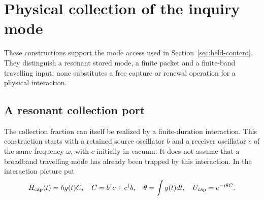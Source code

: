\documentclass[aps,pre,onecolumn,superscriptaddress,floatfix,longbibliography]{revtex4-2}
\begin{document}
\appendix
\section{Physical collection of the inquiry mode}
\label{app:collection}

These constructions support the mode access used in
Section~\ref{sec:held-content}. They distinguish a resonant stored mode,
a finite packet and a finite-band travelling input; none substitutes
a free capture or renewal operation for a physical interaction.

\subsection{A resonant collection port}
\label{sec:resonant-collector}

The collection fraction can itself be realized by a finite-duration interaction.
This construction starts with a retained source oscillator $b$ and a receiver
oscillator $c$ of the same frequency $\omega$, with $c$ initially in vacuum.
It does not assume that a broadband travelling mode has already been trapped
by this interaction. In the interaction picture put
\[
 H_{\rm cap}(t)=\hbar g(t)C,\quad
 C=b^\dagger c+c^\dagger b,\quad
 \theta=\int g(t)dt,\quad
 U_{\rm cap}=e^{-i\theta C}.
\]
\end{document}
